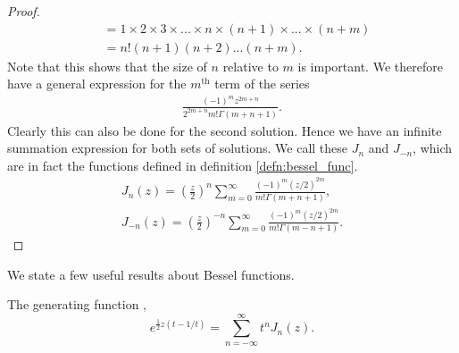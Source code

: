 \begin{proof}
\begin{align*}
      &= 1 \times 2 \times 3 \times ... \times n \times (n+1) \times ... \times (n+m) \\
      &= n! (n+1)(n+2)...(n+m).
  \end{align*}
  Note that this shows that the size of $n$ relative to $m$ is important. We therefore have a general expression for the $m^{\text{th}}$ term of the series
  \begin{align*}
     \frac{(-1)^mz^{2m+n}}{2^{2m+n}m!\Gamma(m+n+1)}.
  \end{align*}
  Clearly this can also be done for the second solution. Hence we have an infinite summation expression for both sets of solutions. We call these $J_n$ and $J_{-n}$, which are in fact the functions defined in definition \ref{defn:bessel_func}.
  \begin{align*}
    J_n(z) = \left(\frac{z}{2}\right)^n \sum^\infty_{m=0} \frac{(-1)^m(z/2)^{2m}}{m!\Gamma(m+n+1)}, \\
    J_{-n}(z) = \left(\frac{z}{2}\right)^{-n} \sum^\infty_{m=0} \frac{(-1)^m(z/2)^{2m}}{m!\Gamma(m-n+1)}.
  \end{align*}
  \end{proof}

We state a few useful results about Bessel functions.

\begin{defn}\label{defn:generating_function} The generating function \parencite{watson44besselfunc},
\begin{equation}\label{eq:generating_function}
  e^{\frac{1}{2} z(t-1/t)} = \sum _{n=-\infty}^{\infty} t^nJ_{n}(z).
\end{equation}
\end{defn}


